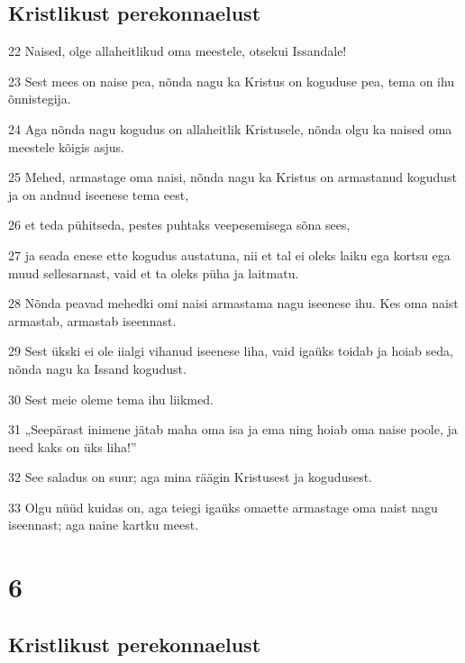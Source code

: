 \section*{Kristlikust perekonnaelust}

\par 22 Naised, olge allaheitlikud oma meestele, otsekui Issandale!
\par 23 Sest mees on naise pea, nõnda nagu ka Kristus on koguduse pea, tema on ihu õnnistegija.
\par 24 Aga nõnda nagu kogudus on allaheitlik Kristusele, nõnda olgu ka naised oma meestele kõigis asjus.
\par 25 Mehed, armastage oma naisi, nõnda nagu ka Kristus on armastanud kogudust ja on andnud iseenese tema eest,
\par 26 et teda pühitseda, pestes puhtaks veepesemisega sõna sees,
\par 27 ja seada enese ette kogudus austatuna, nii et tal ei oleks laiku ega kortsu ega muud sellesarnast, vaid et ta oleks püha ja laitmatu.
\par 28 Nõnda peavad mehedki omi naisi armastama nagu iseenese ihu. Kes oma naist armastab, armastab iseennast.
\par 29 Sest ükski ei ole iialgi vihanud iseenese liha, vaid igaüks toidab ja hoiab seda, nõnda nagu ka Issand kogudust.
\par 30 Sest meie oleme tema ihu liikmed.
\par 31 „Seepärast inimene jätab maha oma isa ja ema ning hoiab oma naise poole, ja need kaks on üks liha!”
\par 32 See saladus on suur; aga mina räägin Kristusest ja kogudusest.
\par 33 Olgu nüüd kuidas on, aga teiegi igaüks omaette armastage oma naist nagu iseennast; aga naine kartku meest.


\chapter{6}

\section*{Kristlikust perekonnaelust}

